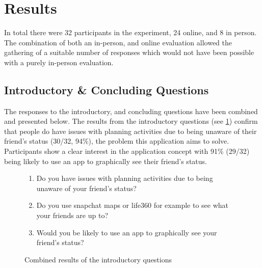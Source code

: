 \section{Results}
In total there were 32 participants in the experiment, 24 online, and 8 in person. The combination of both an in-person, and online evaluation allowed the gathering of a suitable number of responses which would not have been possible with a purely in-person evaluation.

\subsection{Introductory \& Concluding Questions}
The responses to the introductory, and concluding questions have been combined and presented below. The results from the introductory questions (see \ref{fig:introAns}) confirm that people do have issues with planning activities due to being unaware of their friend's status (30/32, 94\%), the problem this application aims to solve. Participants show a clear interest in the application concept with 91\% (29/32) being likely to use an app to graphically see their friend's status. 

\begin{figure}[H]

\begin{enumerate}
    \item Do you have issues with planning activities due to being unaware of your friend's status?
    \item Do you use snapchat maps or life360 for example to see what your friends are up to?
    \item Would you be likely to use an app to graphically see your friend's status?
\end{enumerate}

\caption{Combined results of the introductory questions}
\label{fig:introAns}
\end{figure}
\FloatBarrier

